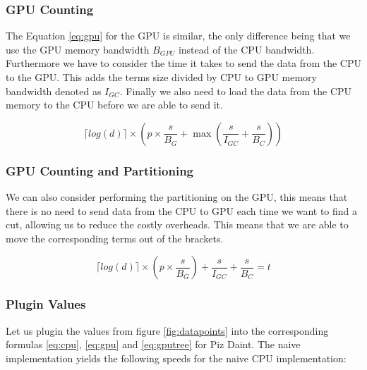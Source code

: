 \documentclass[]{article}
\begin{document}
\subsubsection{GPU Counting}


The Equation \ref{eq:gpu} for the GPU is similar, the only difference being that we use the GPU memory bandwidth $B_{GPU}$ instead of the CPU bandwidth. Furthermore we have to consider the time it takes to send the data from the CPU to the GPU. This adds the terms size divided by CPU to GPU memory bandwidth denoted as $I_{GC}$. Finally we also need to load the data from the CPU memory to the CPU before we are able to send it. 

\begin{center}
	\begin{equation}
			\lceil log(d) \rceil \times \left ( p \times \frac{s}{B_{G}} +\max{ ( \frac{s}{I_{GC}}  + \frac{s}{B_{C}} )} \right )
		\label{eq:gpu}
	\end{equation}
\end{center}


\subsubsection{GPU Counting and Partitioning}\label{gpu-tree-building}

We can also consider performing the partitioning on the GPU, this means that there is no need to send data from the CPU to GPU each time we want to find a cut, allowing us to reduce the costly overheads. This means that we are able to move the corresponding terms out of the brackets. 

\begin{center}
	\begin{equation}
		\lceil log(d) \rceil \times \left ( p \times \frac{s}{B_{G}} \right ) + \frac{s}{I_{GC}} + \frac{s}{B_{C}} = t
		\label{eq:gputree}
	\end{equation}
\end{center}

\newcommand\s{12}

\newcommand\p{32}


\normalfont
\subsubsection{Plugin Values} 

Let us plugin the values from figure \ref{fig:datapoints} into the corresponding formulas \ref{eq:cpu}, \ref{eq:gpu} and \ref{eq:gputree} for Piz Daint.
The naive implementation yields the following speeds for the naive CPU  implementation:
\end{document}
